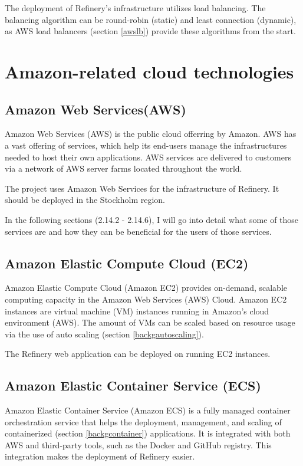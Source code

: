 		The deployment of Refinery's infrastructure utilizes load balancing. The balancing algorithm can be round-robin (static) and 
		least connection (dynamic), as AWS load balancers (section \ref{awslb}) provide these algorithms from the start.

\section{Amazon-related cloud technologies}
	\subsection{Amazon Web Services(AWS)} \label{backgraws}
		Amazon Web Services (AWS) \cite{aws} is the public cloud offerring by Amazon. AWS has a vast offering
		of services, which help its end-users manage the infrastructures needed to host their own applications.
		AWS services are delivered to customers via a network of AWS server farms located throughout the world.

		The project uses Amazon Web Services for the infrastructure of Refinery. 
		It should be deployed in the Stockholm region.

		In the following sections (2.14.2 - 2.14.6), I will go into detail what some of those services are and how
		they can be beneficial for the users of those services.

	\subsection{Amazon Elastic Compute Cloud (EC2)} \label{backgrec2}
		Amazon Elastic Compute Cloud (Amazon EC2) \cite{ec2} provides on-demand, scalable computing capacity in the Amazon 
		Web Services (AWS) Cloud.  
		Amazon EC2 instances are virtual machine (VM) instances running in Amazon's cloud environment (AWS). 
		The amount of VMs can be scaled based on resource usage via the use of auto scaling (section \ref{backgautoscaling}).

		The Refinery web application can be deployed on running EC2 instances.

	\subsection{Amazon Elastic Container Service (ECS)} \label{backgecs}
		Amazon Elastic Container Service (Amazon ECS) \cite{ecs} is a fully managed container orchestration service that helps 
		the deployment, management, and scaling of containerized (section \ref{backgcontainer}) applications. 
		It is integrated with both AWS and third-party tools, 
		such as the Docker and GitHub registry. This integration makes the deployment of Refinery easier.

